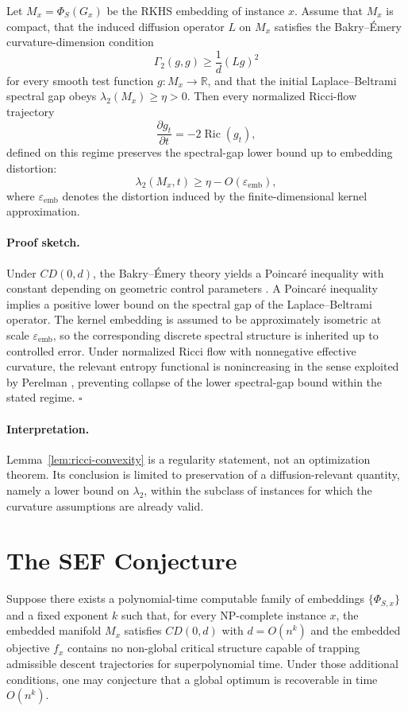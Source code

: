 \documentclass{svjour3}
\begin{document}
\begin{lemma}
\label{lem:ricci-convexity}
Let $M_x=\Phi_S(G_x)$ be the RKHS embedding of instance $x$. Assume that $M_x$ is compact, that the induced diffusion operator $L$ on $M_x$ satisfies the Bakry--\'Emery curvature-dimension condition
\[
\Gamma_2(g,g)\ge \frac{1}{d}(Lg)^2
\]
for every smooth test function $g:M_x\to\mathbb{R}$, and that the initial Laplace--Beltrami spectral gap obeys $\lambda_2(M_x)\ge \eta>0$. Then every normalized Ricci-flow trajectory
\[
\frac{\partial g_t}{\partial t} = -2\operatorname{Ric}(g_t),
\]
defined on this regime preserves the spectral-gap lower bound up to embedding distortion:
\[
\lambda_2(M_x,t)\ge \eta - O(\varepsilon_{\mathrm{emb}}),
\]
where $\varepsilon_{\mathrm{emb}}$ denotes the distortion induced by the finite-dimensional kernel approximation.
\end{lemma}

\paragraph{Proof sketch.}
Under $CD(0,d)$, the Bakry--\'Emery theory yields a Poincar\'e inequality with constant depending on geometric control parameters \citep{bakry1985diffusions,ledoux2001concentration}. A Poincar\'e inequality implies a positive lower bound on the spectral gap of the Laplace--Beltrami operator. The kernel embedding is assumed to be approximately isometric at scale $\varepsilon_{\mathrm{emb}}$, so the corresponding discrete spectral structure is inherited up to controlled error. Under normalized Ricci flow with nonnegative effective curvature, the relevant entropy functional is nonincreasing in the sense exploited by Perelman \citep{perelman2002entropy}, preventing collapse of the lower spectral-gap bound within the stated regime. \hfill$\square$

\paragraph{Interpretation.}
Lemma~\ref{lem:ricci-convexity} is a regularity statement, not an optimization theorem. Its conclusion is limited to preservation of a diffusion-relevant quantity, namely a lower bound on $\lambda_2$, within the subclass of instances for which the curvature assumptions are already valid.

\section{The SEF Conjecture}
\begin{proposition}
Suppose there exists a polynomial-time computable family of embeddings $\{\Phi_{S,x}\}$ and a fixed exponent $k$ such that, for every NP-complete instance $x$, the embedded manifold $M_x$ satisfies $CD(0,d)$ with $d=O(n^k)$ and the embedded objective $f_x$ contains no non-global critical structure capable of trapping admissible descent trajectories for superpolynomial time. Under those additional conditions, one may conjecture that a global optimum is recoverable in time $O(n^k)$.
\end{proposition}
\end{document}
